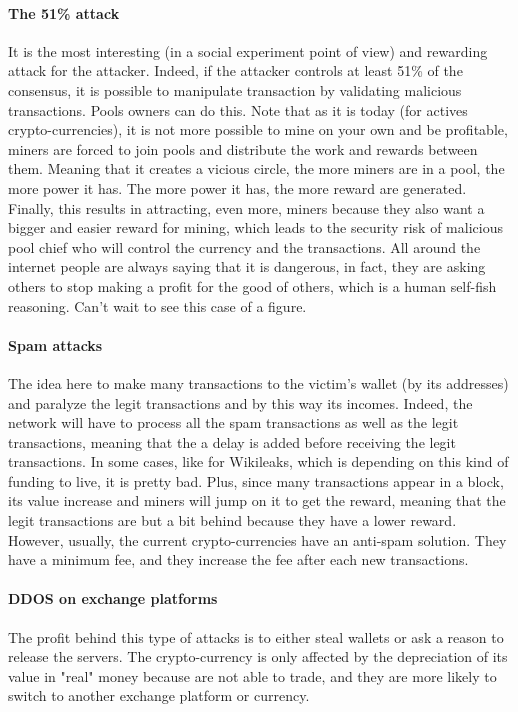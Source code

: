 \paragraph{The 51\% attack}
It is the most interesting (in a social experiment point of view) and rewarding attack for the attacker. Indeed, if the attacker controls at least 51\% of the consensus, it is possible to manipulate transaction by validating malicious transactions. Pools owners can do this. Note that as it is today (for actives crypto-currencies), it is not more possible to mine on your own and be profitable, miners are forced to join pools and distribute the work and rewards between them. Meaning that it creates a vicious circle, the more miners are in a pool, the more power it has. The more power it has, the more reward are generated. Finally, this results in attracting, even more, miners because they also want a bigger and easier reward for mining, which leads to the security risk of malicious pool chief who will control the currency and the transactions. All around the internet people are always saying that it is dangerous, in fact, they are asking others to stop making a profit for the good of others, which is a human self-fish reasoning. Can't wait to see this case of a figure.

\paragraph{Spam attacks}
The idea here to make many transactions to the victim's wallet (by its addresses) and paralyze the legit transactions and by this way its incomes. Indeed, the network will have to process all the spam transactions as well as the legit transactions, meaning that the a delay is added before receiving the legit transactions. In some cases, like for Wikileaks\cite{TheBitcoinNews2015BitcoinAttacks}, which is depending on this kind of funding to live, it is pretty bad. Plus, since many transactions appear in a block, its value increase and miners will jump on it to get the reward, meaning that the legit transactions are but a bit behind because they have a lower reward. However, usually, the current crypto-currencies have an anti-spam solution. They have a minimum fee, and they increase the fee after each new transactions.

\paragraph{DDOS on exchange platforms}
The profit behind this type of attacks is to either steal wallets or ask a reason to release the servers. The crypto-currency is only affected by the depreciation of its value in "real" money because are not able to trade, and they are more likely to switch to another exchange platform or currency.

